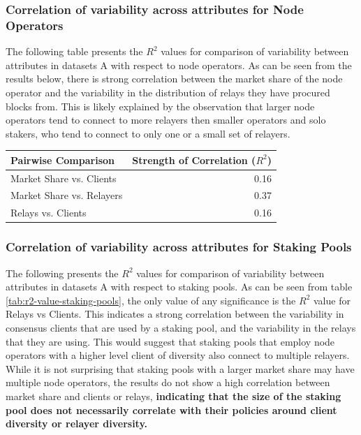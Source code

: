 \documentclass[conference]{IEEEtran}
\begin{document}
\subsubsection{Correlation of variability across attributes for Node Operators}

The following table presents the $R^2$ values for comparison of variability between attributes in datasets A with respect to node operators. As can be seen from the results below, there is strong correlation between the market share of the node operator and the variability in the distribution of relays they have procured blocks from. This is likely explained by the observation that larger node operators tend to connect to more relayers then smaller operators and solo stakers, who tend to connect to only one or a small set of relayers.

\begin{table}[htbp]
    \centering
    \normalsize
    \begin{tabular}{p{3.9cm}r}
        \toprule
        Pairwise Comparison & Strength of Correlation ($R^2$) \\
        \midrule
        Market Share vs. Clients & 0.16 \\
        Market Share vs. Relayers & 0.37 \\
        Relays vs. Clients & 0.16 \\
        \bottomrule
    \end{tabular}
\end{table}

\subsubsection{Correlation of variability across attributes for Staking Pools}

The following presents the $R^2$ values for comparison of variability between attributes in datasets A with respect to staking pools.  As can be seen from table \ref{tab:r2-value-staking-pools}, the only value of any significance is the $R^2$ value for Relays vs Clients.  This indicates a strong correlation between the variability in consensus clients that are used by a staking pool, and the variability in the relays that they are using.  This would suggest that staking pools that employ node operators with a higher level client of diversity also connect to multiple relayers.  While it is not surprising that staking pools with a larger market share may have multiple node operators, the results do not show a high correlation between market share and clients or relays, \textbf{indicating that the size of the staking pool does not necessarily correlate with their policies around client diversity or relayer diversity.}
\end{document}
